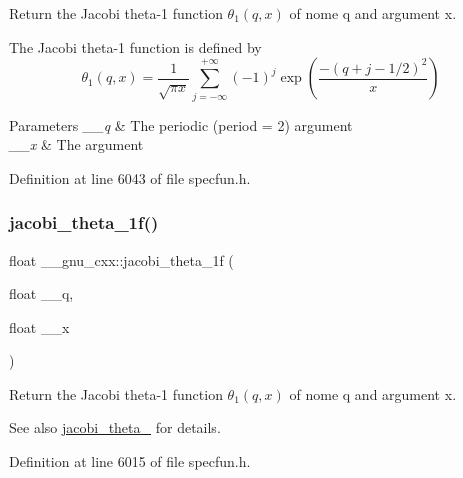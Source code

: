 Return the Jacobi theta-\/1 function $ \theta_1(q,x) $ of nome {\ttfamily q} and argument {\ttfamily x}.

The Jacobi theta-\/1 function is defined by \[ \theta_1(q,x) = \frac{1}{\sqrt{\pi x}} \sum_{j=-\infty}^{+\infty} (-1)^j \exp\left( \frac{-(q + j - 1/2)^2}{x} \right) \]


\begin{DoxyParams}{Parameters}
{\em \+\_\+\+\_\+q} & The periodic (period = 2) argument \\
\hline
{\em \+\_\+\+\_\+x} & The argument \\
\hline
\end{DoxyParams}


Definition at line 6043 of file specfun.\+h.

\mbox{\label{group__mathsf__gnu_gacccd2107c26e39400e589a59e0af674a}} 
\subsubsection{\texorpdfstring{jacobi\+\_\+theta\+\_\+1f()}{jacobi\_theta\_1f()}}
{\footnotesize\ttfamily float \+\_\+\+\_\+gnu\+\_\+cxx\+::jacobi\+\_\+theta\+\_\+1f (\begin{DoxyParamCaption}\item[{float}]{\+\_\+\+\_\+q,  }\item[{float}]{\+\_\+\+\_\+x }\end{DoxyParamCaption})\hspace{0.3cm}{\ttfamily [inline]}}

Return the Jacobi theta-\/1 function $ \theta_1(q,x) $ of nome {\ttfamily q} and argument {\ttfamily x}.

\begin{DoxySeeAlso}{See also}
\hyperlink{group__mathsf__gnu_ga996ca8c1fff75e2d4f196e99e0919933}{jacobi\+\_\+theta\+\_} for details. 
\end{DoxySeeAlso}


Definition at line 6015 of file specfun.\+h.

\mbox{\label{group__mathsf__gnu_ga823eba555ecac89556a0f4c1e62dbc5a}} 
